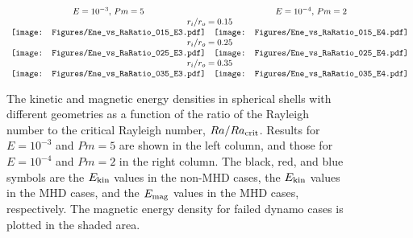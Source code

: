 \begin{figure*}
\begin{center}
\[
\begin{array}{ccc}
\mbox{$E = 10^{-3}$, $Pm = 5$} &
\mbox{$E = 10^{-4}$, $Pm = 2$} \\
\multicolumn{2}{c}{\mbox{$r_{i} / r_{o} = 0.15$}} \\
\texttt{[image: Figures/Ene\_vs\_RaRatio\_015\_E3.pdf]} &
\texttt{[image: Figures/Ene\_vs\_RaRatio\_015\_E4.pdf]} \\
\multicolumn{2}{c}{\mbox{$r_{i} / r_{o} = 0.25$}} \\
\texttt{[image: Figures/Ene\_vs\_RaRatio\_025\_E3.pdf]} &
\texttt{[image: Figures/Ene\_vs\_RaRatio\_025\_E4.pdf]} \\
\multicolumn{2}{c}{\mbox{$r_{i} / r_{o} = 0.35$}} \\
\texttt{[image: Figures/Ene\_vs\_RaRatio\_035\_E3.pdf]} &
\texttt{[image: Figures/Ene\_vs\_RaRatio\_035\_E4.pdf]}
\end{array}
\]
\end{center}
\caption{The kinetic and magnetic energy densities 
in spherical shells with different geometries
as a function of the ratio of the Rayleigh number to the critical Rayleigh number, $Ra / Ra_{\rm crit}$.
Results for $E = 10^{-3}$ and $Pm = 5$ are shown in the left column, and those for $E = 10^{-4}$ and $Pm = 2$ in the right column.
The black, red, and blue symbols are the $E_{\rm kin}$ values in the non-MHD cases, the $E_{\rm kin}$ values in the MHD cases, and the $E_{\rm mag}$ values in the MHD cases, respectively.
The magnetic energy density for failed dynamo cases is plotted in the shaded area. 
}
\label{fig:fig_3}
\end{figure*}